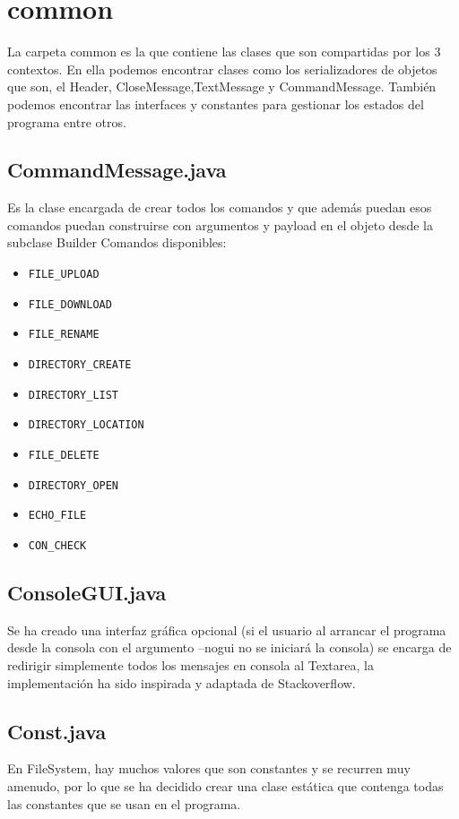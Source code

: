 \documentclass[a4paper, 12pt]{report}
\begin{document}
\chapter{common}

La carpeta common es la que contiene las clases que son compartidas por los 3 contextos. En ella podemos encontrar clases como los serializadores de objetos que son, el Header, CloseMessage,TextMessage y CommandMessage. También podemos encontrar las interfaces y constantes para gestionar los estados del programa entre otros.
\section{CommandMessage.java}

Es la clase encargada de crear todos los comandos y que además puedan esos comandos puedan construirse con argumentos y payload en el objeto desde la subclase Builder
Comandos disponibles:

\begin{itemize}
	\item \texttt{FILE\_UPLOAD}
	\item \texttt{FILE\_DOWNLOAD}
	\item \texttt{FILE\_RENAME}
	\item \texttt{DIRECTORY\_CREATE}
	\item \texttt{DIRECTORY\_LIST}
	\item \texttt{DIRECTORY\_LOCATION}
	\item \texttt{FILE\_DELETE}
	\item \texttt{DIRECTORY\_OPEN}
	\item \texttt{ECHO\_FILE}
	\item \texttt{CON\_CHECK}
\end{itemize}

\section{ConsoleGUI.java}
Se ha creado una interfaz gráfica opcional (si el usuario al arrancar el programa desde la consola con el argumento --nogui no se iniciará la consola) se encarga de redirigir simplemente todos los mensajes en consola al Textarea, la implementación ha sido inspirada y adaptada de Stackoverflow. \cite{console-output-to-textarea}
\section{Const.java}
En FileSystem, hay muchos valores que son constantes y se recurren muy amenudo, por lo que se ha decidido crear una clase estática que contenga todas las constantes que se usan en el programa.
\end{document}
